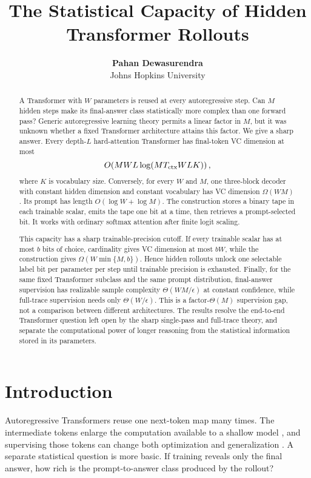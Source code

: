 \documentclass{article}
\title{The Statistical Capacity of Hidden Transformer Rollouts}
\author{\textbf{Pahan Dewasurendra} \\ Johns Hopkins University}
\newcommand{\1}{\mathbf 1}
\begin{document}
\maketitle

\begin{abstract}
A Transformer with $W$ parameters is reused at every autoregressive step. Can $M$ hidden steps make its final-answer class statistically more complex than one forward pass? Generic autoregressive learning theory permits a linear factor in $M$, but it was unknown whether a fixed Transformer architecture attains this factor. We give a sharp answer. Every depth-$L$ hard-attention Transformer has final-token VC dimension at most \[ O\!\left(MWL\log(MT_{\rm ctx}WLK)\right), \] where $K$ is vocabulary size. Conversely, for every $W$ and $M$, one three-block decoder with constant hidden dimension and constant vocabulary has VC dimension $\Omega(WM)$. Its prompt has length $O(\log W+\log M)$. The construction stores a binary tape in each trainable scalar, emits the tape one bit at a time, then retrieves a prompt-selected bit. It works with ordinary softmax attention after finite logit scaling.

This capacity has a sharp trainable-precision cutoff. If every trainable scalar has at most $b$ bits of choice, cardinality gives VC dimension at most $bW$, while the construction gives $\Omega(W\min\{M,b\})$. Hence hidden rollouts unlock one selectable label bit per parameter per step until trainable precision is exhausted. Finally, for the same fixed Transformer subclass and the same prompt distribution, final-answer supervision has realizable sample complexity $\Theta(WM/\epsilon)$ at constant confidence, while full-trace supervision needs only $\Theta(W/\epsilon)$. This is a factor-$\Theta(M)$ supervision gap, not a comparison between different architectures. The results resolve the end-to-end Transformer question left open by the sharp single-pass and full-trace theory, and separate the computational power of longer reasoning from the statistical information stored in its parameters.
\end{abstract}

\section{Introduction}

Autoregressive Transformers reuse one next-token map many times. The intermediate tokens enlarge the computation available to a shallow model \citep{merrill2023expressive,li2024serial}, and supervising those tokens can change both optimization and generalization \citep{kim2025parity,altabaa2025cot}. A separate statistical question is more basic. If training reveals only the final answer, how rich is the prompt-to-answer class produced by the rollout?
\end{document}
